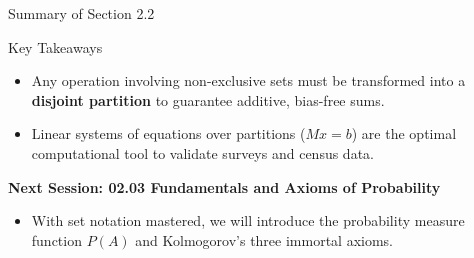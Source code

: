 \documentclass[10pt,aspectratio=169]{beamer}
\begin{document}
\begin{frame}{Summary of Section 2.2}
  \begin{block}{Key Takeaways}
    \begin{itemize}
      \item Any operation involving non-exclusive sets must be transformed into a \textbf{disjoint partition} to guarantee additive, bias-free sums. \pause
      \item Linear systems of equations over partitions ($Mx = b$) are the optimal computational tool to validate surveys and census data.
    \end{itemize}
  \end{block}
  
  \vspace{0.6em}
  \pause
  {\large \color{TecAzulOscuro}\textbf{Next Session: 02.03 Fundamentals and Axioms of Probability}}
  \vspace{0.3em}
  \begin{itemize}
    \item With set notation mastered, we will introduce the probability measure function $P(A)$ and Kolmogorov's three immortal axioms.
  \end{itemize}
\end{frame}
\end{document}

